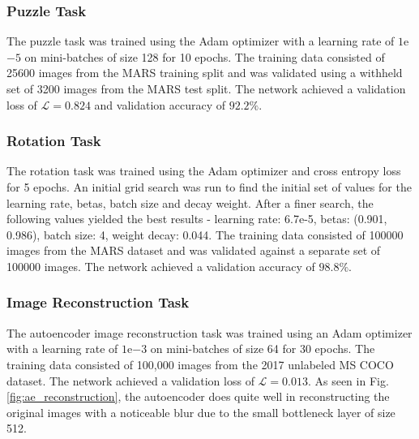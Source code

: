 \documentclass[10pt,twocolumn,letterpaper]{article}
\begin{document}
\subsubsection{Puzzle Task}
The puzzle task was trained using the Adam optimizer with a learning rate of $1$e$-5$ on mini-batches of size 128 for 10 epochs. The training data consisted of 25600 images from the MARS training split and was validated using a withheld set of 3200 images from the MARS test split. The network achieved a validation loss of $\mathcal{L}=0.824$ and validation accuracy of $92.2\%$. 
\subsubsection{Rotation Task}
The rotation task was trained using the Adam optimizer and cross entropy loss for 5 epochs. An initial grid search was run to find the initial set of values for the learning rate, betas, batch size and decay weight. After a finer search, the following values yielded the best results - learning rate: 6.7e-5, betas: (0.901, 0.986), batch size: 4, weight decay: 0.044. 
The training data consisted of 100000 images from the MARS dataset and was validated against a separate set of 100000 images. The network achieved a validation accuracy of $98.8\%$. 

\subsubsection{Image Reconstruction Task}

The autoencoder image reconstruction task was trained using an Adam optimizer with a learning rate of $1$e$-3$ on mini-batches of size 64 for 30 epochs. The training data consisted of 100,000 images from the 2017 unlabeled MS COCO dataset. The network achieved a validation loss of $\mathcal{L}=0.013$. As seen in Fig. \ref{fig:ae_reconstruction}, the autoencoder does quite well in reconstructing the original images with a noticeable blur due to the small bottleneck layer of size 512. 
\end{document}
